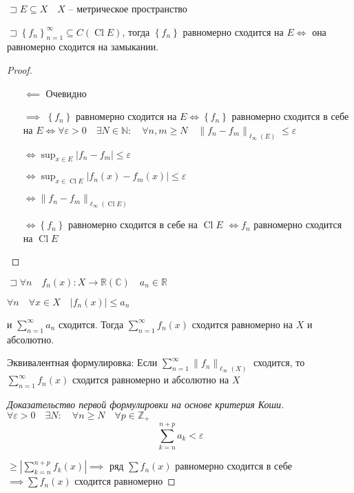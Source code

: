 \documentclass{book}
\newcommand\N{\ensuremath{\mathbb{N}}}
\newcommand\R{\ensuremath{\mathbb{R}}}
\newcommand\Z{\ensuremath{\mathbb{Z}}}
\renewcommand\C{\ensuremath{\mathbb{C}}}
\theoremstyle{definition}
\DeclareMathOperator{\Cl}{Cl}
\begin{document}
    \begin{statement}
        $\sqsupset E\subseteq X\quad X$ -- метрическое пространство

        $\sqsupset \left\{ f_n \right\} _{n=1}^{\infty }\subseteq C\left( \Cl E \right) $, тогда $\left\{ f_n \right\} $ равномерно сходится на $E \iff $ она равномерно сходится на замыкании. 
    \end{statement}
    \begin{proof}
        \begin{itemize}
            \item []
            \item [$\impliedby $] Очевидно
            \item [$\implies $]  $\left\{ f_n \right\} $ равномерно сходится на $E \iff \left\{ f_n \right\} $ равномерно сходится в себе на $E \iff  \forall \varepsilon>0 \quad \exists N\in \N : \quad \forall n, m \geqslant N\quad \|f_n - f_m\|_{\ell _{\infty }(E)}\leqslant \varepsilon$

                $\iff  \sup_{x\in E} |f_n - f_m| \leqslant \varepsilon$ 

                $\iff  \sup_{x\in \Cl E}\left| f_n(x) - f_m(x) \right| \leqslant \varepsilon$

                $\iff  \|f_n - f_m\|_{\ell _{\infty }\left( \Cl E \right)}$

                $\iff \left\{ f_n \right\} $ равномерно сходится в себе на $\Cl E$  $\iff  f_n$ равномерно сходится на $\Cl E$
        \end{itemize}
    \end{proof}

    \begin{theorem}
        $\sqsupset \forall n\quad f_n(x):X \to \R(\C)\quad a_n\in \R$

        $\forall n\quad \forall x\in X\quad |f_n(x)|\leqslant a_n$

        и $\sum_{n=1}^{\infty } a_n$ сходится. Тогда $\sum_{n=1}^{\infty } f_n(x)$ сходится равномерно на $X$ и абсолютно.

        Эквивалентная формулировка: Если $\sum_{n=1}^{\infty } \|f_n\|_{\ell _{\infty }(X)}$ сходится, то $\sum_{n=1}^{\infty } f_n(x)$ сходится равномерно и абсолютно на $X$
    \end{theorem}
    \begin{proof}
        [Доказательство первой формулировки на основе критерия Коши]

        $\forall \varepsilon>0\quad \exists N:\quad \forall n \geqslant N\quad \forall p\in \Z _+$ \[\sum_{k=n}^{n+p} a_k<\varepsilon\]

        $\geqslant \left| \sum_{k=n}^{n+p} f_k(x) \right| \implies$ ряд $\sum f_n(x)$ равномерно сходится в себе  $ \implies \sum f_n(x)$  сходится равномерно 
    \end{proof}
\end{document}
